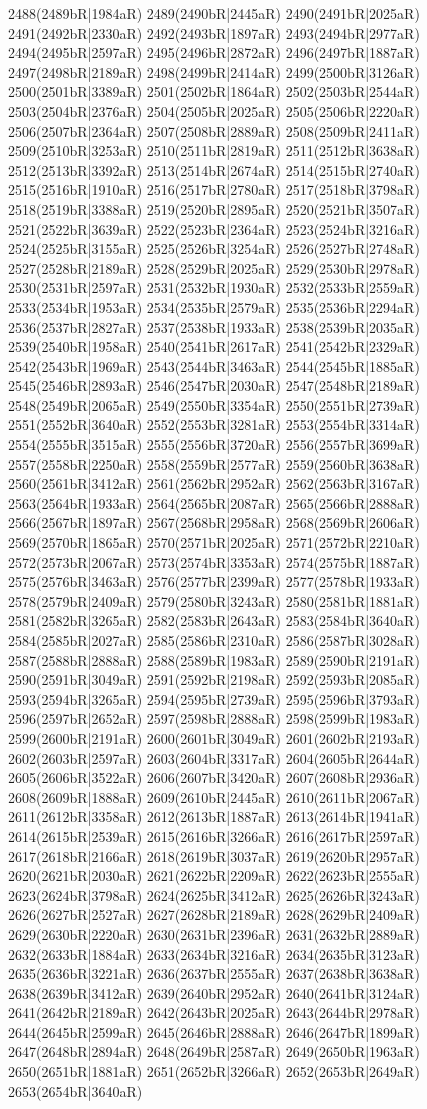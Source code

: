2488(2489bR|1984aR) 2489(2490bR|2445aR) 2490(2491bR|2025aR) 2491(2492bR|2330aR) 2492(2493bR|1897aR) 2493(2494bR|2977aR) 2494(2495bR|2597aR) 2495(2496bR|2872aR) 2496(2497bR|1887aR) 2497(2498bR|2189aR) 2498(2499bR|2414aR) 2499(2500bR|3126aR) 2500(2501bR|3389aR) 2501(2502bR|1864aR) 2502(2503bR|2544aR) 2503(2504bR|2376aR) 2504(2505bR|2025aR) 2505(2506bR|2220aR) 2506(2507bR|2364aR) 2507(2508bR|2889aR) 2508(2509bR|2411aR) 2509(2510bR|3253aR) 2510(2511bR|2819aR) 2511(2512bR|3638aR) 2512(2513bR|3392aR) 2513(2514bR|2674aR) 2514(2515bR|2740aR) 2515(2516bR|1910aR) 2516(2517bR|2780aR) 2517(2518bR|3798aR) 2518(2519bR|3388aR) 2519(2520bR|2895aR) 2520(2521bR|3507aR) 2521(2522bR|3639aR) 2522(2523bR|2364aR) 2523(2524bR|3216aR) 2524(2525bR|3155aR) 2525(2526bR|3254aR) 2526(2527bR|2748aR) 2527(2528bR|2189aR) 2528(2529bR|2025aR) 2529(2530bR|2978aR) 2530(2531bR|2597aR) 2531(2532bR|1930aR) 2532(2533bR|2559aR) 2533(2534bR|1953aR) 2534(2535bR|2579aR) 2535(2536bR|2294aR) 2536(2537bR|2827aR) 2537(2538bR|1933aR) 2538(2539bR|2035aR) 2539(2540bR|1958aR) 2540(2541bR|2617aR) 2541(2542bR|2329aR) 2542(2543bR|1969aR) 2543(2544bR|3463aR) 2544(2545bR|1885aR) 2545(2546bR|2893aR) 2546(2547bR|2030aR) 2547(2548bR|2189aR) 2548(2549bR|2065aR) 2549(2550bR|3354aR) 2550(2551bR|2739aR) 2551(2552bR|3640aR) 2552(2553bR|3281aR) 2553(2554bR|3314aR) 2554(2555bR|3515aR) 2555(2556bR|3720aR) 2556(2557bR|3699aR) 2557(2558bR|2250aR) 2558(2559bR|2577aR) 2559(2560bR|3638aR) 2560(2561bR|3412aR) 2561(2562bR|2952aR) 2562(2563bR|3167aR) 2563(2564bR|1933aR) 2564(2565bR|2087aR) 2565(2566bR|2888aR) 2566(2567bR|1897aR) 2567(2568bR|2958aR) 2568(2569bR|2606aR) 2569(2570bR|1865aR) 2570(2571bR|2025aR) 2571(2572bR|2210aR) 2572(2573bR|2067aR) 2573(2574bR|3353aR) 2574(2575bR|1887aR) 2575(2576bR|3463aR) 2576(2577bR|2399aR) 2577(2578bR|1933aR) 2578(2579bR|2409aR) 2579(2580bR|3243aR) 2580(2581bR|1881aR) 2581(2582bR|3265aR) 2582(2583bR|2643aR) 2583(2584bR|3640aR) 2584(2585bR|2027aR) 2585(2586bR|2310aR) 2586(2587bR|3028aR) 2587(2588bR|2888aR) 2588(2589bR|1983aR) 2589(2590bR|2191aR) 2590(2591bR|3049aR) 2591(2592bR|2198aR) 2592(2593bR|2085aR) 2593(2594bR|3265aR) 2594(2595bR|2739aR) 2595(2596bR|3793aR) 2596(2597bR|2652aR) 2597(2598bR|2888aR) 2598(2599bR|1983aR) 2599(2600bR|2191aR) 2600(2601bR|3049aR) 2601(2602bR|2193aR) 2602(2603bR|2597aR) 2603(2604bR|3317aR) 2604(2605bR|2644aR) 2605(2606bR|3522aR) 2606(2607bR|3420aR) 2607(2608bR|2936aR) 2608(2609bR|1888aR) 2609(2610bR|2445aR) 2610(2611bR|2067aR) 2611(2612bR|3358aR) 2612(2613bR|1887aR) 2613(2614bR|1941aR) 2614(2615bR|2539aR) 2615(2616bR|3266aR) 2616(2617bR|2597aR) 2617(2618bR|2166aR) 2618(2619bR|3037aR) 2619(2620bR|2957aR) 2620(2621bR|2030aR) 2621(2622bR|2209aR) 2622(2623bR|2555aR) 2623(2624bR|3798aR) 2624(2625bR|3412aR) 2625(2626bR|3243aR) 2626(2627bR|2527aR) 2627(2628bR|2189aR) 2628(2629bR|2409aR) 2629(2630bR|2220aR) 2630(2631bR|2396aR) 2631(2632bR|2889aR) 2632(2633bR|1884aR) 2633(2634bR|3216aR) 2634(2635bR|3123aR) 2635(2636bR|3221aR) 2636(2637bR|2555aR) 2637(2638bR|3638aR) 2638(2639bR|3412aR) 2639(2640bR|2952aR) 2640(2641bR|3124aR) 2641(2642bR|2189aR) 2642(2643bR|2025aR) 2643(2644bR|2978aR) 2644(2645bR|2599aR) 2645(2646bR|2888aR) 2646(2647bR|1899aR) 2647(2648bR|2894aR) 2648(2649bR|2587aR) 2649(2650bR|1963aR) 2650(2651bR|1881aR) 2651(2652bR|3266aR) 2652(2653bR|2649aR) 2653(2654bR|3640aR) 